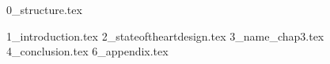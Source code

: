 \documentclass[11pt, twoside]{hsrthesis}
\begin{document}
    \maketitle

    {0_structure.tex}

    \tableofcontents

    {1_introduction.tex}
    {2_stateoftheartdesign.tex}
    {3_name_chap3.tex}
    {4_conclusion.tex}
    {6_appendix.tex}

    \listoffigures{}
    \listcodesnippets{}
    \listglossaryentries{}
    
\end{document}
